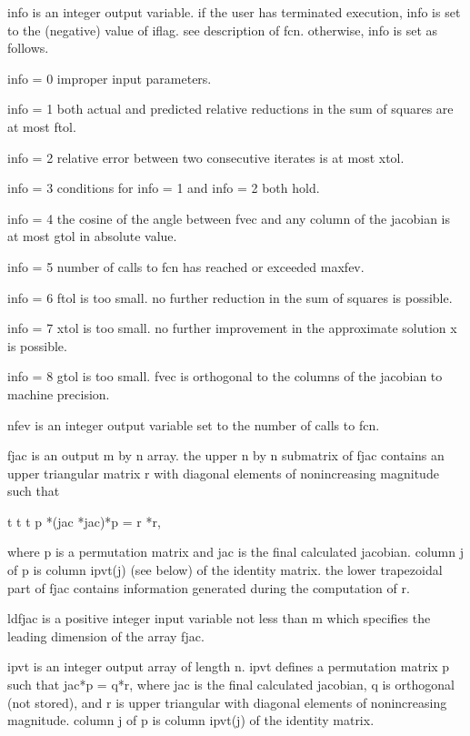 \documentclass[11pt,twoside,nolof]{starlink}
\begin{document}
\begin{terminalv}
       info is an integer output variable. if the user has
         terminated execution, info is set to the (negative)
         value of iflag. see description of fcn. otherwise,
         info is set as follows.

         info = 0  improper input parameters.

         info = 1  both actual and predicted relative reductions
                   in the sum of squares are at most ftol.

         info = 2  relative error between two consecutive iterates
                   is at most xtol.

         info = 3  conditions for info = 1 and info = 2 both hold.

         info = 4  the cosine of the angle between fvec and any
                   column of the jacobian is at most gtol in
                   absolute value.

         info = 5  number of calls to fcn has reached or
                   exceeded maxfev.

         info = 6  ftol is too small. no further reduction in
                   the sum of squares is possible.

         info = 7  xtol is too small. no further improvement in
                   the approximate solution x is possible.

         info = 8  gtol is too small. fvec is orthogonal to the
                   columns of the jacobian to machine precision.

       nfev is an integer output variable set to the number of
         calls to fcn.

       fjac is an output m by n array. the upper n by n submatrix
         of fjac contains an upper triangular matrix r with
         diagonal elements of nonincreasing magnitude such that

                t     t           t
               p *(jac *jac)*p = r *r,

         where p is a permutation matrix and jac is the final
         calculated jacobian. column j of p is column ipvt(j)
         (see below) of the identity matrix. the lower trapezoidal
         part of fjac contains information generated during
         the computation of r.

       ldfjac is a positive integer input variable not less than m
         which specifies the leading dimension of the array fjac.

       ipvt is an integer output array of length n. ipvt
         defines a permutation matrix p such that jac*p = q*r,
         where jac is the final calculated jacobian, q is
         orthogonal (not stored), and r is upper triangular
         with diagonal elements of nonincreasing magnitude.
         column j of p is column ipvt(j) of the identity matrix.


\end{terminalv}
\end{document}
